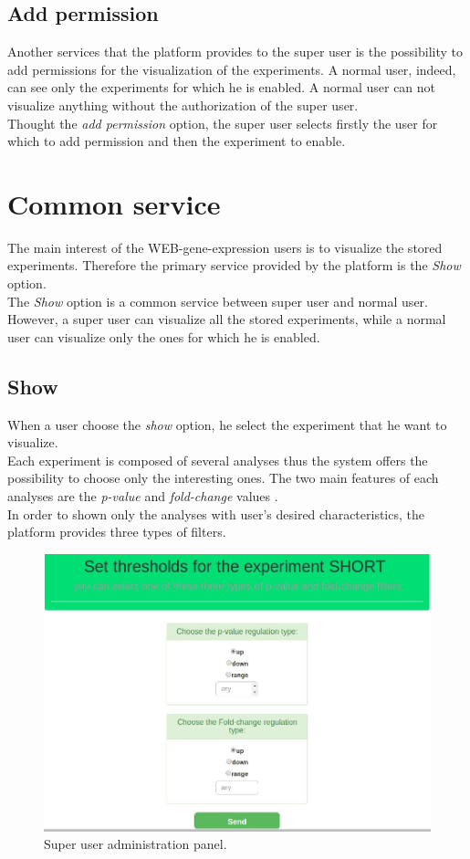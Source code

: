 \documentclass[a4paper]{report}
\begin{document}
\subsection{Add permission}
Another services that the platform provides to the super user  is the possibility to add permissions for the visualization of the experiments. A normal user, indeed, can see only the experiments for which he is enabled. A normal user can not visualize anything without the authorization of the super user.\\
Thought the \emph{add permission} option, the super user selects firstly the user for which to add permission and then the experiment to enable.

\section{Common service}
The main interest of the WEB-gene-expression users is to visualize the stored experiments. Therefore the primary service provided by the platform is the \emph{Show} option.\\
The 	\emph{Show} option is a common service between super user and normal user. However, a super user can visualize all the stored experiments, while a normal user can visualize only the ones for which he is enabled.

\subsection{Show}
When a user choose the \emph{show} option, he select the experiment that he want to visualize.\\
Each experiment is composed of several analyses thus the system offers the possibility to choose only the interesting ones. The two main features of each analyses are the \emph{p-value} and \emph{fold-change} values .\\
In order to shown only the analyses with user's desired characteristics, the platform provides three types of filters.

\begin{figure}[htb] 
\begin{center}
\includegraphics[scale=0.4]{figure/filters.jpg} 
\end{center}
\caption{Super user administration panel.}
\label{filters}
\end{figure}
\end{document}
